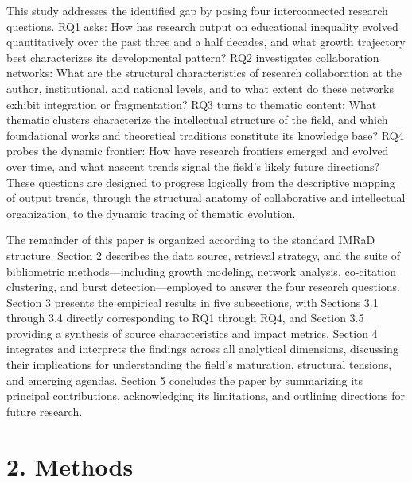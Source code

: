 \documentclass[12pt,a4paper]{article}
\begin{document}
This study addresses the identified gap by posing four interconnected research questions. RQ1 asks: How has research output on educational inequality evolved quantitatively over the past three and a half decades, and what growth trajectory best characterizes its developmental pattern? RQ2 investigates collaboration networks: What are the structural characteristics of research collaboration at the author, institutional, and national levels, and to what extent do these networks exhibit integration or fragmentation? RQ3 turns to thematic content: What thematic clusters characterize the intellectual structure of the field, and which foundational works and theoretical traditions constitute its knowledge base? RQ4 probes the dynamic frontier: How have research frontiers emerged and evolved over time, and what nascent trends signal the field's likely future directions? These questions are designed to progress logically from the descriptive mapping of output trends, through the structural anatomy of collaborative and intellectual organization, to the dynamic tracing of thematic evolution.

The remainder of this paper is organized according to the standard IMRaD structure. Section 2 describes the data source, retrieval strategy, and the suite of bibliometric methods—including growth modeling, network analysis, co-citation clustering, and burst detection—employed to answer the four research questions. Section 3 presents the empirical results in five subsections, with Sections 3.1 through 3.4 directly corresponding to RQ1 through RQ4, and Section 3.5 providing a synthesis of source characteristics and impact metrics. Section 4 integrates and interprets the findings across all analytical dimensions, discussing their implications for understanding the field's maturation, structural tensions, and emerging agendas. Section 5 concludes the paper by summarizing its principal contributions, acknowledging its limitations, and outlining directions for future research.

\section{2. Methods}
\end{document}
